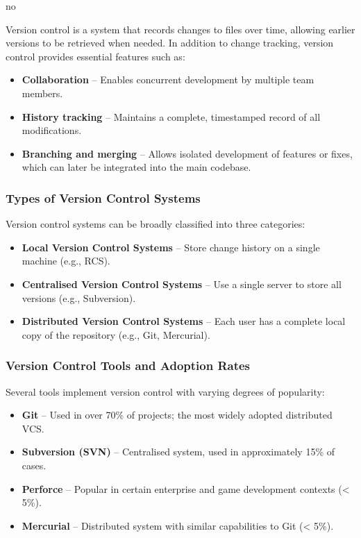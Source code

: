 no\documentclass{article}
\begin{document}
Version control is a system that records changes to files over time, allowing earlier versions to be retrieved when needed. In addition to change tracking, version control provides essential features such as:

\begin{itemize}
    \item \textbf{Collaboration} – Enables concurrent development by multiple team members.
    \item \textbf{History tracking} – Maintains a complete, timestamped record of all modifications.
    \item \textbf{Branching and merging} – Allows isolated development of features or fixes, which can later be integrated into the main codebase.
\end{itemize}

\subsubsection{Types of Version Control Systems}

Version control systems can be broadly classified into three categories:

\begin{itemize}
    \item \textbf{Local Version Control Systems} – Store change history on a single machine (e.g., RCS).
    \item \textbf{Centralised Version Control Systems} – Use a single server to store all versions (e.g., Subversion).
    \item \textbf{Distributed Version Control Systems} – Each user has a complete local copy of the repository (e.g., Git, Mercurial).
\end{itemize}

\subsubsection{Version Control Tools and Adoption Rates}

Several tools implement version control with varying degrees of popularity:

\begin{itemize}
    \item \textbf{Git} – Used in over 70\% of projects; the most widely adopted distributed VCS.
    \item \textbf{Subversion (SVN)} – Centralised system, used in approximately 15\% of cases.
    \item \textbf{Perforce} – Popular in certain enterprise and game development contexts (< 5\%).
    \item \textbf{Mercurial} – Distributed system with similar capabilities to Git (< 5\%).
\end{itemize}
\end{document}
